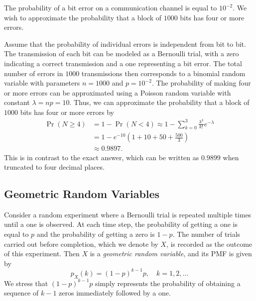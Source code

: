 \begin{example}
The probability of a bit error on a communication channel is equal to $10^{-2}$.
We wish to approximate the probability that a block of $1000$ bits has four or more errors.

Assume that the probability of individual errors is independent from bit to bit.
The transmission of each bit can be modeled as a Bernoulli trial, with a zero indicating a correct transmission and a one representing a bit error.
The total number of errors in $1000$ transmissions then corresponds to a binomial random variable with parameters $n = 1000$ and $p = 10^{-2}$.
The probability of making four or more errors can be approximated using a Poisson random variable with constant $\lambda = np = 10$.
Thus, we can approximate the probability that a block of $1000$ bits has four or more errors by
\begin{equation*}
\begin{split}
\Pr ( N \geq 4 ) &= 1 - \Pr ( N < 4 )
\approx 1 - \sum_{k=0}^3 \frac{\lambda^k}{k!} e^{-\lambda} \\
&= 1 - e^{-10} \left( 1 + 10 + 50 + \frac{500}{3} \right) \\
&\approx 0.9897 .
\end{split}
\end{equation*}
This is in contrast to the exact answer, which can be written as $0.9899$ when truncated to four decimal places.
\end{example}


\subsection{Geometric Random Variables}

Consider a random experiment where a Bernoulli trial is repeated multiple times until a one is observed.
At each time step, the probability of getting a one is equal to $p$ and the probability of getting a zero is $1-p$.
The number of trials carried out before completion, which we denote by $X$, is recorded as the outcome of this experiment.
Then $X$ is a \emph{geometric random variable}, and its PMF is given by 
\begin{equation*}
p_X (k) = (1-p)^{k-1} p, \quad k = 1, 2, \ldots
\end{equation*}
We stress that $(1-p)^{k-1} p$ simply represents the probability of obtaining a sequence of $k-1$ zeros immediately followed by a one.

